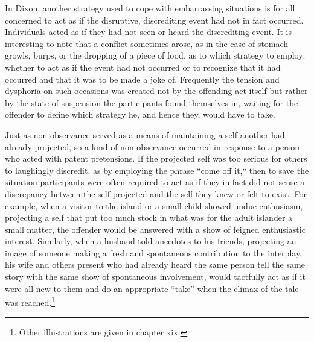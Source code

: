 \documentclass[twoside,symmetric,nobib,justified]{tufte-book}
\begin{document}
In Dixon, another strategy used to cope with embarrassing situations is
for all concerned to act as if the disruptive, discrediting event had
not in fact occurred. Individuals acted as if they had not seen or heard
the discrediting event. It is interesting to note that a conflict
sometimes arose, as in the case of stomach growls, burps, or the
dropping of a piece of food, as to which strategy to employ: whether to
act as if the event had not occurred or to recognize that it had
occurred and that it was to be made a joke of. Frequently the tension
and dysphoria on such occasions was created not by the offending act
itself but rather by the state of suspension the participants found
themselves in, waiting for the offender to define which strategy he, and
hence they, would have to take.

Just as non-observance served as a means of maintaining a self another
had already projected, so a kind of non-observance occurred in response
to a person who acted with patent pretensions. If the projected self was
too serious for others to laughingly discredit, as by employing the
phrase ``come off it,`` then to save the situation participants were
often required to act as if they in fact did not sense a discrepancy
between the self projected and the self they knew or felt to exist. For
example, when a visitor to the island or a small child showed undue
enthusiasm, projecting a self that put too much stock in what was for
the adult islander a small matter, the offender would be answered with a
show of feigned enthusiastic interest. Similarly, when a husband told
anecdotes to his friends, projecting an image of someone making a fresh
and spontaneous contribution to the interplay, his wife and others
present who had already heard the same person tell the same story with
the same show of spontaneous involvement, would tactfully act as if it
were all new to them and do an appropriate ``take'' when the climax of
the tale was reached.\footnote{Other illustrations are given in chapter
  xix.}
\end{document}
